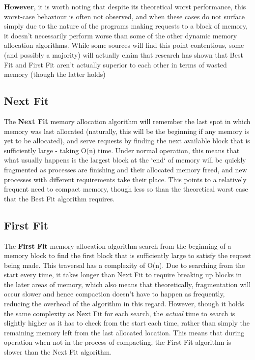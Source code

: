 \documentclass[11pt]{article}
\begin{document}
\textbf{However}, it is worth noting that despite its theoretical worst performance, this worst-case behaviour is often not observed, and when these cases do not surface simply due to the nature of the programs making requests to a block of memory, it doesn't necessarily perform worse than some of the other dynamic memory allocation algorithms. While some sources will find this point contentious, some (and possibly a majority) will actually claim that research has shown that Best Fit and First Fit aren't actually superior to each other in terms of wasted memory (though the latter holds) 

\subsection{Next Fit}
The \textbf{Next Fit} memory allocation algorithm will remember the last spot in which memory was last allocated (naturally, this will be the beginning if any memory is yet to be allocated), and serve requests by finding the next available block that is sufficiently large - taking O(n) time. Under normal operation, this means that what usually happens is the largest block at the `end` of memory will be quickly fragmented as processes are finishing and their allocated memory freed, and new processes with different requirements take their place. This points to a relatively frequent need to compact memory, though less so than the theoretical worst case that the Best Fit algorithm requires.

\subsection{First Fit}
The \textbf{First Fit} memory allocation algorithm search from the beginning of a memory block to find the first block that is sufficiently large to satisfy the request being made. This traversal has a complexity of O(n). Due to searching from the start every time, it takes longer than Next Fit to require breaking up blocks in the later areas of memory, which also means that theoretically, fragmentation will occur slower and hence compaction doesn't have to happen as frequently, reducing the overhead of the algorithm in this regard. However, though it holds the same complexity as Next Fit for each search, the \textit{actual} time to search is slightly higher as it has to check from the start each time, rather than simply the remaining memory left from the last allocated location. This means that during operation when not in the process of compacting, the First Fit algorithm is slower than the Next Fit algorithm. 
\end{document}
